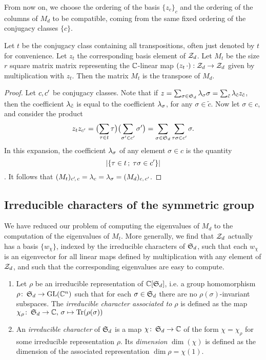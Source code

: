 From now on, we choose the ordering of the basis $\{z_c\}_c$ and the ordering of the columns of $M_d$ to be compatible, \ie coming from the same fixed ordering of the conjugacy classes $\{c\}$.

\begin{prop} \label{prop:transpose-correspondence}
 Let $t$ be the conjugacy class containing all transpositions, often just denoted by $t$ for convenience. Let $z_t$ the corresponding basis element of $\mathcal{Z}_d$. Let $M_t$ be the size $r$ square matrix matrix representing the $\mathbb{C}$-linear map $(z_t\,\cdot):\mathcal{Z}_d\to\mathcal{Z}_d$ given by multiplication with $z_t$. Then the matrix $M_t$ is the transpose of $M_d$.
\end{prop}
\begin{proof}
 Let $c,c'$ be conjugacy classes. Note that if $z=\sum_{\sigma\in\operatorname{\mathfrak{S}}_d}\lambda_\sigma \sigma=\sum_{\tilde c}\lambda_{\tilde c} z_{\tilde c}$, then the coefficient $\lambda_{\tilde c}$ is equal to the coefficient $\lambda_{\sigma}$, for any $\sigma\in \tilde c$. Now let $\sigma\in c$, and consider the product
 \[
  z_tz_{c'}=\bigl(\sum_{\tau\in t}\tau\bigr)\bigl(\sum_{\sigma'\in c'}\sigma'\bigr)=\sum_{\sigma\in\operatorname{\mathfrak{S}}_d}\sum_{\tau\sigma\in c'}\sigma.
 \]
 In this expansion, the coefficient $\lambda_{\sigma}$ of any element $\sigma\in c$ is the quantity \[|\{\tau\in t\,;\; \tau\sigma\in c'\}|\]. It follows that $(M_t)_{c'\!,\, c}=\lambda_c=\lambda_{\sigma}=(M_d)_{c,\, c'}$.
\end{proof}

\subsection{Irreducible characters of the symmetric group}

We have reduced our problem of computing the eigenvalues of $M_d$ to the computation of the eigenvalues of $M_t$. More generally, we find that $\mathcal{Z}_d$ actually has a basis $\{w_\chi\}$, indexed by the irreducible characters of $\operatorname{\mathfrak{S}}_d$, such that each $w_\chi$ is an eigenvector for all linear maps defined by multiplication with any element of $\mathcal{Z}_d$, and such that the corresponding eigenvalues are easy to compute.

\begin{defi}
 \begin{enumerate}
  \item Let $\rho$ be an irreducible representation of $\mathbb{C}[\operatorname{\mathfrak{S}}_d]$, i.e. a group homomorphism $\rho\colon \operatorname{\mathfrak{S}}_d\to \operatorname{GL}(\mathbb{C}^n)$ such that for each $\sigma\in\operatorname{\mathfrak{S}}_d$ there are no $\rho(\sigma)$-invariant subspaces. The \emph{irreducible character associated to $\rho$} is defined as the map $\chi_\rho\colon \operatorname{\mathfrak{S}}_d\to\mathbb{C},\, \sigma\mapsto\operatorname{Tr}(\rho(\sigma))$
  \item An \emph{irreducible character} of $\operatorname{\mathfrak{S}}_d$ is a map $\chi\colon \operatorname{\mathfrak{S}}_d\to\mathbb{C}$ of the form $\chi=\chi_\rho$ for some irreducible representation $\rho$. Its \emph{dimension} $\dim(\chi)$ is defined as the dimension of the associated representation $\dim\rho=\chi(1)$.
 \end{enumerate}
\end{defi}


